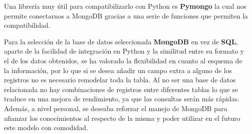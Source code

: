 Una librería muy útil para compatibilizarlo con Python es \textbf{Pymongo}\cite{Pymongo} la cual nos permite conectarnos a MongoDB gracias a una serie de funciones que permiten la compatibilidad.
  
  
  
Para la selección de la base de datos seleccionada \textbf{MongoDB} en vez de \textbf{SQL}, aparte de la facilidad de integración en Python y la similitud entre su formato y el de los datos obtenidos, se ha valorado la flexibilidad en cuanto al esquema de la información, por lo que si se desea añadir un campo extra a alguno de los registros no es necesario remodelar toda la tabla. Al no ser una base de datos relacionada no hay combinaciones de registros entre diferentes tablas lo que se traduce en una mejora de rendimiento, ya que las consultas serán más rápidas. Además, a nivel personal, se deseaba reforzar el manejo de MongoDB para afianzar los conocimientos al respecto de la misma y poder utilizar en el futuro este modelo con comodidad.  



 
